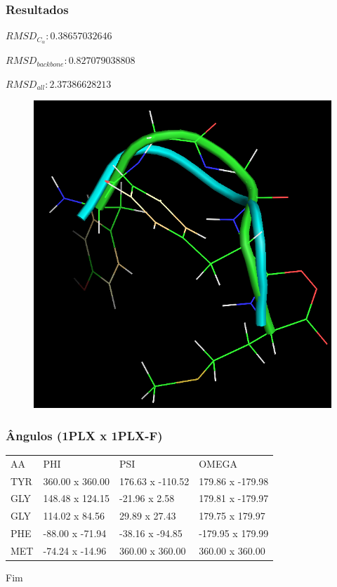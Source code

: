 \documentclass{beamer}
\begin{document}
\begin{frame}
\frametitle{Resultados}
$RMSD_{C_\alpha}: 0.38657032646$

$RMSD_{backbone}: 0.827079038808$

$RMSD_{all}: 2.37386628213$ 

\begin{figure}
\includegraphics[width=0.5\linewidth]{1PLX-F.png}
\end{figure}
\end{frame}

\begin{frame}
\frametitle{Ângulos (1PLX x 1PLX-F)}
\begin{table}[]
\centering
\label{my-label}
\begin{tabular}{llll}
AA & PHI             &  PSI              &  OMEGA             \\
TYR         & 360.00 x 360.00 &  176.63 x -110.52 &  179.86 x -179.98  \\
GLY         & 148.48 x 124.15 &  -21.96 x    2.58 &  179.81 x -179.97  \\
GLY         & 114.02 x  84.56 &   29.89 x   27.43 &  179.75 x  179.97  \\
PHE         & -88.00 x -71.94 &  -38.16 x  -94.85 & -179.95 x  179.99  \\
MET         & -74.24 x -14.96 &  360.00 x  360.00 &  360.00 x  360.00
\end{tabular}
\end{table}
\end{frame}


\begin{frame}
\Huge{\centerline{Fim}}
\end{frame}

\end{document}
